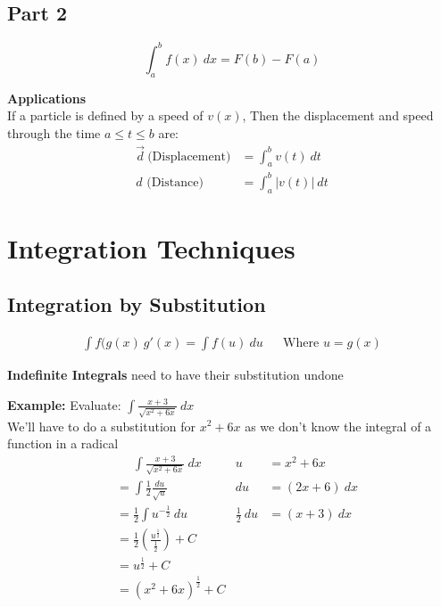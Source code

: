 \documentclass{template}
\begin{document}
\newpage
\subsection{Part 2} %
\begin{mdframed}
    $$\int_a^b f(x) \ dx = F(b) - F(a)$$
\end{mdframed}

\textbf{Applications} \\
If a particle is defined by a speed of $v(x)$, Then the displacement and speed through the time $a \leq t \leq b$ are:
\begin{align*}
    \Vec{d} \ \text{(Displacement)} &= \int_a^b v(t) \ dt \\
    \text{$d$ (Distance)} &= \int_a^b |v(t)| \ dt
\end{align*}

\section{Integration Techniques}
\subsection{Integration by Substitution} %

\begin{mdframed}
    \begin{align*}
        \int f(g(x) \ g'(x) = \int f(u) \ du && \text{Where } u = g(x)
    \end{align*}
\end{mdframed}

\textbf{Indefinite Integrals} need to have their substitution undone 

\vspace{4 mm}
\begin{tcolorbox}
\textbf{Example:} Evaluate: $\displaystyle \int \frac{x+3}{\sqrt{x^2 + 6x}} \ dx$ \\
We'll have to do a substitution for $x^2 + 6x$ as we don't know the integral of a function in a radical
\begin{align*}
    &\phantom{{}={}} \int \frac{x+3}{\sqrt{x^2 + 6x}} \ dx & u &= x^2 + 6x \\
    &= \int \frac{1}{2} \frac{du}{\sqrt{u}} & du &= (2x + 6) \ dx \\
    &= \frac{1}{2}\int u^{-\tfrac{1}{2}} \ du & \frac{1}{2} \ du &= (x + 3) \ dx \\
    &= \frac{1}{2}(\frac{u^{\tfrac{1}{2}}}{\tfrac{1}{2}}) + C & \\
    &= u^{\tfrac{1}{2}} + C & \\
    &= (x^2 + 6x)^{\tfrac{1}{2}} + C &
\end{align*}
\end{tcolorbox}
\end{document}
